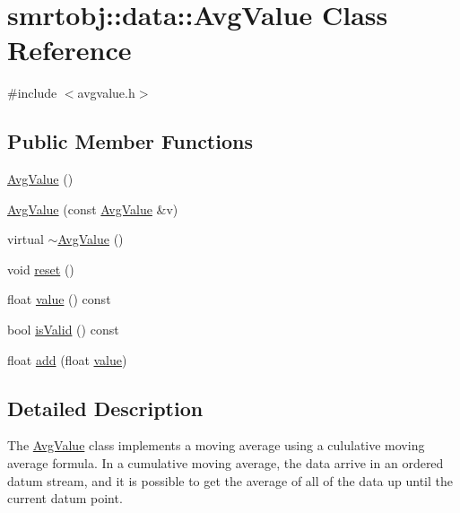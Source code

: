 \hypertarget{classsmrtobj_1_1data_1_1_avg_value}{}\section{smrtobj\+:\+:data\+:\+:Avg\+Value Class Reference}
\label{classsmrtobj_1_1data_1_1_avg_value}


{\ttfamily \#include $<$avgvalue.\+h$>$}

\subsection*{Public Member Functions}
\begin{DoxyCompactItemize}
\item 
\hyperlink{classsmrtobj_1_1data_1_1_avg_value_a8cbe114baf7324d79cee11979a6e6a99}{Avg\+Value} ()
\item 
\hyperlink{classsmrtobj_1_1data_1_1_avg_value_a00996d9c894650af2b1176ba507c5c46}{Avg\+Value} (const \hyperlink{classsmrtobj_1_1data_1_1_avg_value}{Avg\+Value} \&v)
\item 
virtual \hyperlink{classsmrtobj_1_1data_1_1_avg_value_ae41c2c06bad9a42328428834087b515a}{$\sim$\+Avg\+Value} ()
\item 
void \hyperlink{classsmrtobj_1_1data_1_1_avg_value_a328e6e7a7865b5e6c5e2306388bbd75d}{reset} ()
\item 
float \hyperlink{classsmrtobj_1_1data_1_1_avg_value_a49ddff6c0e51bfbc2394b37d21a1d655}{value} () const 
\item 
bool \hyperlink{classsmrtobj_1_1data_1_1_avg_value_a5cea9434d761b6ef93c4452d48c9d840}{is\+Valid} () const 
\item 
float \hyperlink{classsmrtobj_1_1data_1_1_avg_value_ad6d0f942767eba04fa21bb5e42d85da7}{add} (float \hyperlink{classsmrtobj_1_1data_1_1_avg_value_a49ddff6c0e51bfbc2394b37d21a1d655}{value})
\end{DoxyCompactItemize}


\subsection{Detailed Description}
The \hyperlink{classsmrtobj_1_1data_1_1_avg_value}{Avg\+Value} class implements a moving average using a cululative moving average formula. In a cumulative moving average, the data arrive in an ordered datum stream, and it is possible to get the average of all of the data up until the current datum point.

